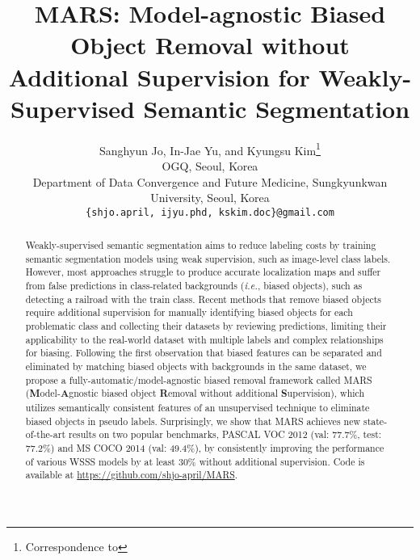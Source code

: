 \documentclass[10pt,twocolumn,letterpaper]{article}
\begin{document}
\title{MARS: Model-agnostic Biased Object Removal without Additional Supervision for Weakly-Supervised Semantic Segmentation}



\author{
    Sanghyun Jo, In-Jae Yu, and Kyungsu Kim\thanks{Correspondence to}\\ 
    {OGQ, Seoul, Korea} \\
    {Department of Data Convergence and Future Medicine, Sungkyunkwan University, Seoul, Korea}\\ \texttt{\{shjo.april, ijyu.phd, kskim.doc\}@gmail.com}\\
} 

\maketitle
\ificcvfinal\thispagestyle{empty}\fi


\begin{abstract}






\vspace{-0.3cm}
Weakly-supervised semantic segmentation aims to reduce labeling costs by training semantic segmentation models using weak supervision, such as image-level class labels. However, most approaches struggle to produce accurate localization maps and suffer from false predictions in class-related backgrounds (\emph{i.e.}, biased objects), such as detecting a railroad with the train class. Recent methods that remove biased objects require additional supervision for manually identifying biased objects for each problematic class and collecting their datasets by reviewing predictions, limiting their applicability to the real-world dataset with multiple labels and complex relationships for biasing. Following the first observation that biased features can be separated and eliminated by matching biased objects with backgrounds in the same dataset, we propose a fully-automatic/model-agnostic biased removal framework called MARS (\textbf{M}odel-\textbf{A}gnostic biased object \textbf{R}emoval without additional \textbf{S}upervision), which utilizes semantically consistent features of an unsupervised technique to eliminate biased objects in pseudo labels. Surprisingly, we show that MARS achieves new state-of-the-art results on two popular benchmarks, PASCAL VOC 2012 (val: 77.7\%, test: 77.2\%) and MS COCO 2014 (val: 49.4\%), by consistently improving the performance of various WSSS models by at least 30\% without additional supervision. Code is available at \url{https://github.com/shjo-april/MARS}. 

\end{abstract}
\end{document}
